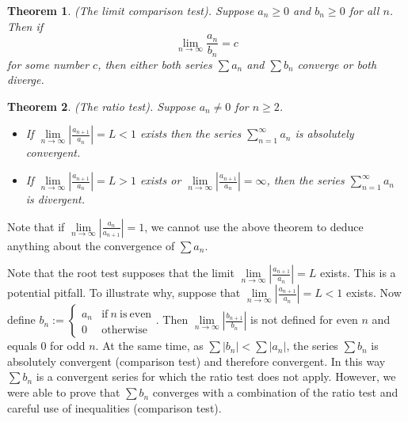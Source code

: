 \documentclass[12pt]{book}
\newtheorem{theorem}{Theorem}[section]
\newcommand{\doublebrace}[4]{\left\{\begin{array}{ll} #1 & #2 \\#3 & #4  \end{array} \right.}
\begin{document}
\begin{theorem}\label{thSeriesTwoSeriesRatioTest}
(The limit comparison test). Suppose $a_n\geq 0$ and $b_n\geq 0$ for all $n$. Then if
\[\lim\limits_{n\to \infty} \frac{a_n}{b_n}= c
\]
for some number $c$, then either both series $\sum a_n$ and $\sum b_n $ converge or both diverge.
\end{theorem}

\begin{theorem}\label{thRatioTest}(The ratio test).  Suppose $a_n\neq 0$ for $n\geq 2$.
\begin{itemize}
\item If $\lim\limits_{n\to\infty}\left|\frac{a_{n+1}}{a_{n}}\right|= L<1$ exists then the series $\sum\limits_{n=1}^\infty a_n$ is absolutely convergent.
\item If $\lim\limits_{n\to\infty}\left|\frac{a_{n+1}}{a_{n}}\right|= L>1$ exists or $\lim\limits_{n\to\infty} \left|\frac{a_{n+1}}{a_{n}}\right| =\infty$, then the series $\sum\limits_{n=1}^\infty a_n$ is divergent.
\end{itemize}
\end{theorem}
Note that if $\lim\limits_{n\to\infty}\left|\frac{a_n}{a_{n+1}}\right|=1$, we cannot use the above theorem to deduce anything about the convergence of $\sum a_n$.

Note that the root test supposes that the limit $\lim\limits_{n\to\infty} \left|\frac{a_{n+1}}{a_{n}}\right| =L$ exists. This is a potential pitfall. To illustrate why, suppose that $\lim\limits_{n\to\infty} \left|\frac{a_{n+1}}{a_{n}}\right| =L<1$ exists. Now define $b_n:=\doublebrace{a_n}{\mathrm{if~}n~\mathrm{is~even}}{0}{\mathrm{otherwise}}$. Then $\lim \limits_{n\to\infty} \left|\frac{b_{n+1}}{b_{n}}\right|$ is not defined for even $n$ and equals 0 for odd $n$. At the same time, as $\sum |b_n|<\sum |a_n|$, the series $\sum b_n$ is absolutely convergent (comparison test) and therefore convergent. In this way $\sum b_n$ is a convergent series for which the ratio test does not apply. However, we were able to prove that $\sum b_n$ converges with a combination of the ratio test and careful use of inequalities (comparison test).
\end{document}
